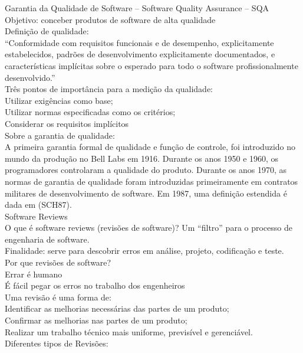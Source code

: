 \documentclass[12pt]{article}
\begin{document}
        Garantia da Qualidade de Software – Software Quality Assurance – SQA\\ 
        Objetivo: conceber produtos de software de alta qualidade \\
        Definição de qualidade: \\
        “Conformidade com requisitos funcionais e de desempenho, explicitamente estabelecidos, padrões de desenvolvimento explicitamente documentados, e características implícitas sobre o esperado para todo o software profissionalmente desenvolvido.” \\
        Três pontos de importância para a medição da qualidade: \\
        Utilizar exigências como base;\\
        Utilizar normas especificadas como os critérios;\\
        Considerar os requisitos implícitos \\
        Sobre a garantia de qualidade: \\
        A primeira garantia formal de qualidade e função de controle, foi     introduzido no mundo da produção no Bell Labs em 1916. Durante os anos 1950 e 1960, os programadores controlaram a qualidade do produto. Durante os anos 1970, as normas de garantia de qualidade foram introduzidas primeiramente em contratos militares de desenvolvimento de software.  Em 1987, uma definição estendida é dada em (SCH87). \\
        Software Reviews \\
        O que é software reviews (revisões de software)? Um “filtro” para o processo de engenharia de software. \\
        Finalidade: serve para descobrir erros em análise, projeto, codificação e teste. \\
        Por que revisões de software? \\
        Errar é humano \\
        É fácil pegar os erros no trabalho dos engenheiros \\
        Uma revisão é uma forma de: \\
        Identificar as melhorias necessárias das partes de um produto;\\
        Confirmar as melhorias nas partes de um produto;\\
        Realizar um trabalho técnico mais uniforme, previsível e gerenciável. \\
        Diferentes tipos de Revisões: \\
\end{document}
